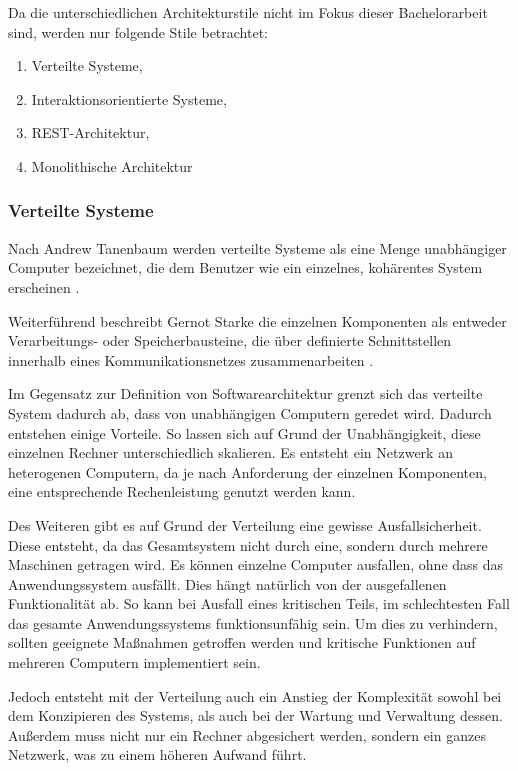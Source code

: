 Da die unterschiedlichen Architekturstile nicht im  Fokus dieser Bachelorarbeit sind, werden nur folgende Stile betrachtet:

\begin{enumerate}
	\item Verteilte Systeme,
	\item Interaktionsorientierte Systeme,
	\item REST-Architektur,
	\item Monolithische Architektur
\end{enumerate}


\subsubsection{Verteilte Systeme}
\label{sec:verteilte-systeme}

Nach Andrew Tanenbaum werden verteilte Systeme als eine Menge unabhängiger Computer bezeichnet, die dem Benutzer wie ein einzelnes, kohärentes System erscheinen \parencite{tanenbaum_verteilte_2007}.

Weiterführend beschreibt Gernot Starke die einzelnen Komponenten als entweder Verarbeitungs- oder Speicherbausteine, die über definierte Schnittstellen innerhalb eines Kommunikationsnetzes zusammenarbeiten \parencite[vgl.][S. 116]{starke_effektive_2015}.

Im Gegensatz zur Definition von Softwarearchitektur grenzt sich das verteilte System dadurch ab, dass von unabhängigen Computern geredet wird. Dadurch entstehen einige Vorteile. So lassen sich auf Grund der Unabhängigkeit, diese einzelnen Rechner unterschiedlich skalieren. Es entsteht ein Netzwerk an heterogenen Computern, da je nach Anforderung der einzelnen Komponenten, eine entsprechende Rechenleistung genutzt werden kann.

Des Weiteren gibt es auf Grund der Verteilung eine gewisse Ausfallsicherheit. Diese entsteht, da das Gesamtsystem nicht durch eine, sondern durch mehrere Maschinen getragen wird. Es können einzelne Computer ausfallen, ohne dass das Anwendungssystem ausfällt. Dies hängt natürlich von der ausgefallenen Funktionalität ab. So kann bei Ausfall eines kritischen Teils,  im schlechtesten Fall das gesamte Anwendungssystems funktionsunfähig sein. Um dies zu verhindern, sollten geeignete Maßnahmen getroffen werden und kritische Funktionen auf mehreren Computern implementiert sein.

Jedoch entsteht mit der Verteilung auch ein Anstieg der Komplexität sowohl bei dem Konzipieren des Systems, als auch bei der Wartung und Verwaltung dessen. Außerdem muss nicht nur ein Rechner abgesichert werden, sondern ein ganzes Netzwerk, was zu einem höheren Aufwand führt.

